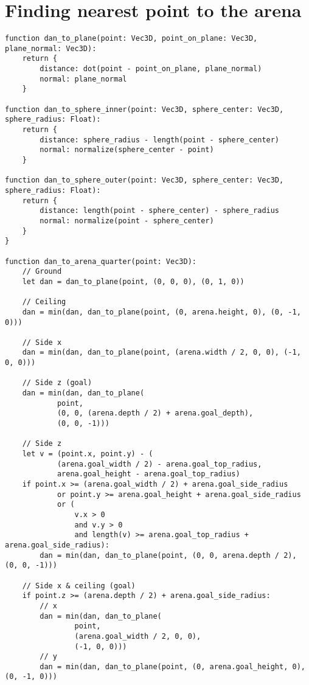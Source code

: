 \section{Finding nearest point to the arena}

\begin{verbatim}
function dan_to_plane(point: Vec3D, point_on_plane: Vec3D, plane_normal: Vec3D):
    return {
        distance: dot(point - point_on_plane, plane_normal)
        normal: plane_normal
    }

function dan_to_sphere_inner(point: Vec3D, sphere_center: Vec3D, sphere_radius: Float):
    return {
        distance: sphere_radius - length(point - sphere_center)
        normal: normalize(sphere_center - point)
    }

function dan_to_sphere_outer(point: Vec3D, sphere_center: Vec3D, sphere_radius: Float):
    return {
        distance: length(point - sphere_center) - sphere_radius
        normal: normalize(point - sphere_center)
    }
}

function dan_to_arena_quarter(point: Vec3D):
    // Ground
    let dan = dan_to_plane(point, (0, 0, 0), (0, 1, 0))

    // Ceiling
    dan = min(dan, dan_to_plane(point, (0, arena.height, 0), (0, -1, 0)))

    // Side x
    dan = min(dan, dan_to_plane(point, (arena.width / 2, 0, 0), (-1, 0, 0)))

    // Side z (goal)
    dan = min(dan, dan_to_plane(
            point,
            (0, 0, (arena.depth / 2) + arena.goal_depth),
            (0, 0, -1)))

    // Side z
    let v = (point.x, point.y) - (
            (arena.goal_width / 2) - arena.goal_top_radius,
            arena.goal_height - arena.goal_top_radius)
    if point.x >= (arena.goal_width / 2) + arena.goal_side_radius
            or point.y >= arena.goal_height + arena.goal_side_radius
            or (
                v.x > 0
                and v.y > 0
                and length(v) >= arena.goal_top_radius + arena.goal_side_radius):
        dan = min(dan, dan_to_plane(point, (0, 0, arena.depth / 2), (0, 0, -1)))

    // Side x & ceiling (goal)
    if point.z >= (arena.depth / 2) + arena.goal_side_radius:
        // x
        dan = min(dan, dan_to_plane(
                point,
                (arena.goal_width / 2, 0, 0),
                (-1, 0, 0)))
        // y
        dan = min(dan, dan_to_plane(point, (0, arena.goal_height, 0), (0, -1, 0)))


\end{verbatim}
